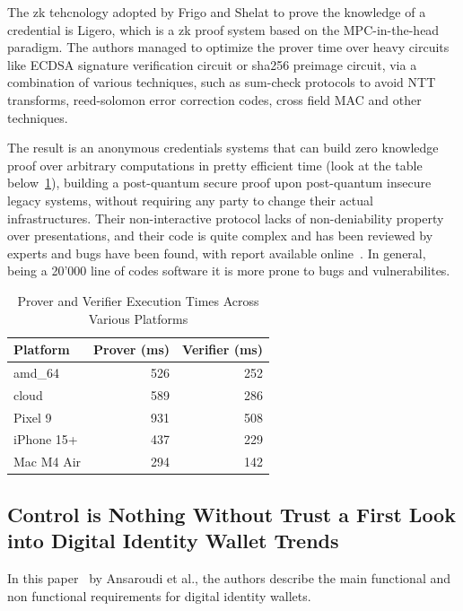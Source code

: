 \documentclass{article}
\begin{document}
The zk tehcnology adopted by Frigo and Shelat to prove the knowledge of a credential is Ligero, which is 
a zk proof system based on the MPC-in-the-head paradigm. The authors managed to optimize the prover time
over heavy circuits like ECDSA signature verification circuit or sha256 preimage circuit, via a combination
of various techniques, such as sum-check protocols to avoid NTT transforms, reed-solomon error correction 
codes, cross field MAC and other techniques.

The result is an anonymous credentials systems that can build zero knowledge proof over arbitrary
computations in pretty efficient time (look at the table below~\ref{tab:prover_verifier_perf}), building a post-quantum secure proof upon post-quantum insecure legacy systems, without
requiring any party to change their actual infrastructures. Their non-interactive protocol lacks of
non-deniability property over presentations, and their code is quite complex and has been reviewed by
experts and bugs have been found, with report available online~\cite{TrailOfBits2025GoogleLongfellow}. In general, 
being a 20'000 line of codes software it is more prone to bugs and vulnerabilites.
\begin{table}[htbp]
\centering
\caption{Prover and Verifier Execution Times Across Various Platforms}
\label{tab:prover_verifier_perf}
\begin{tabular}{lrr}
\toprule
\textbf{Platform} & \textbf{Prover (ms)} & \textbf{Verifier (ms)} \\
\midrule
amd\_64     & 526 & 252 \\
cloud      & 589 & 286 \\
Pixel 9    & 931 & 508 \\
iPhone 15+ & 437 & 229 \\
Mac M4 Air & 294 & 142 \\
\bottomrule
\end{tabular}
\end{table}

\subsection{Control is Nothing Without Trust a First Look into Digital Identity Wallet Trends}
\label{controlisnothingwithouttrust}
In this paper~\cite{Ansaroudi2023Control} by Ansaroudi et al., the authors describe the main 
functional and non functional requirements for digital identity wallets.
\end{document}
